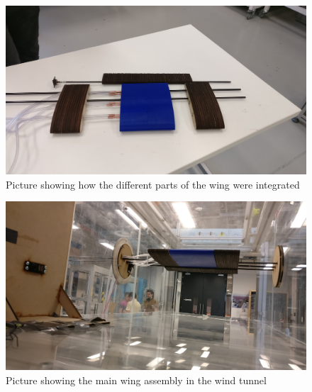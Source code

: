 \thispagestyle{fancy}
\newpage
\begin{figure}[H]
\centering
\includegraphics[scale=0.12]{integ.jpg}
\caption{Picture showing how the different parts of the wing were integrated}
\centering
\end{figure}
\begin{figure}[H]
\centering
\includegraphics[scale=0.15]{wind.jpg}
\caption{Picture showing the main wing assembly in the wind tunnel}
\centering
\end{figure}

